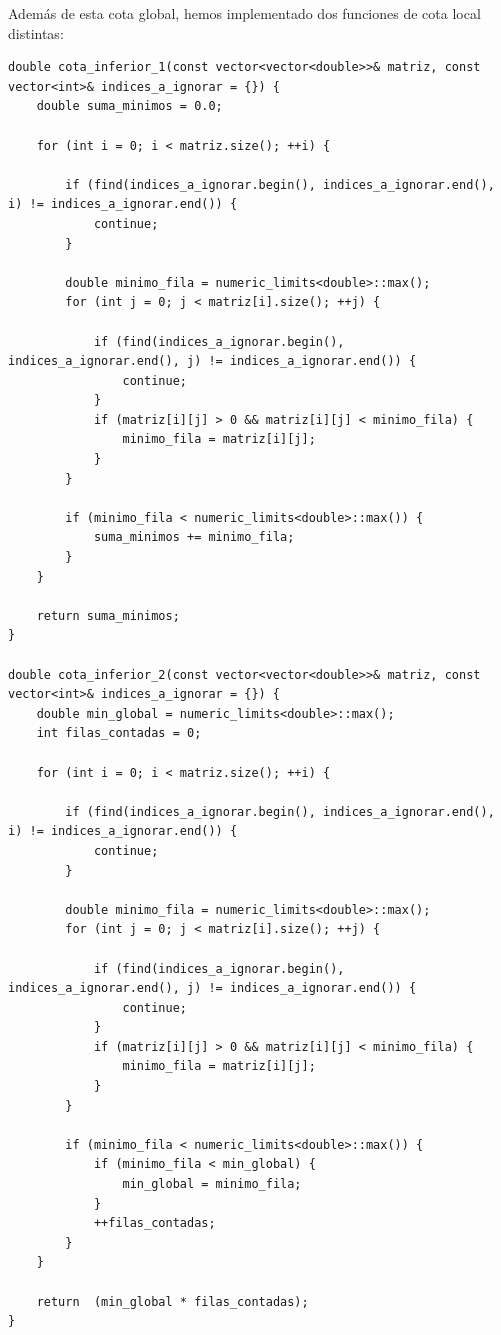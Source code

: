 \documentclass[11pt,openany]{book}
\begin{document}
Además de esta cota global, hemos implementado dos funciones de cota local distintas:
\\ 
\begin{lstlisting}
double cota_inferior_1(const vector<vector<double>>& matriz, const vector<int>& indices_a_ignorar = {}) {
    double suma_minimos = 0.0;

    for (int i = 0; i < matriz.size(); ++i) {
        
        if (find(indices_a_ignorar.begin(), indices_a_ignorar.end(), i) != indices_a_ignorar.end()) {
            continue;
        }

        double minimo_fila = numeric_limits<double>::max();
        for (int j = 0; j < matriz[i].size(); ++j) {
            
            if (find(indices_a_ignorar.begin(), indices_a_ignorar.end(), j) != indices_a_ignorar.end()) {
                continue;
            }
            if (matriz[i][j] > 0 && matriz[i][j] < minimo_fila) {
                minimo_fila = matriz[i][j];
            }
        }

        if (minimo_fila < numeric_limits<double>::max()) {
            suma_minimos += minimo_fila;
        }
    }

    return suma_minimos;
}    

double cota_inferior_2(const vector<vector<double>>& matriz, const vector<int>& indices_a_ignorar = {}) {
    double min_global = numeric_limits<double>::max();
    int filas_contadas = 0;

    for (int i = 0; i < matriz.size(); ++i) {
        
        if (find(indices_a_ignorar.begin(), indices_a_ignorar.end(), i) != indices_a_ignorar.end()) {
            continue;
        }

        double minimo_fila = numeric_limits<double>::max();
        for (int j = 0; j < matriz[i].size(); ++j) {
            
            if (find(indices_a_ignorar.begin(), indices_a_ignorar.end(), j) != indices_a_ignorar.end()) {
                continue;
            }
            if (matriz[i][j] > 0 && matriz[i][j] < minimo_fila) {
                minimo_fila = matriz[i][j];
            }
        }

        if (minimo_fila < numeric_limits<double>::max()) {
            if (minimo_fila < min_global) {
                min_global = minimo_fila;
            }
            ++filas_contadas;
        }
    }

    return  (min_global * filas_contadas);
}
            
\end{lstlisting}
\end{document}
